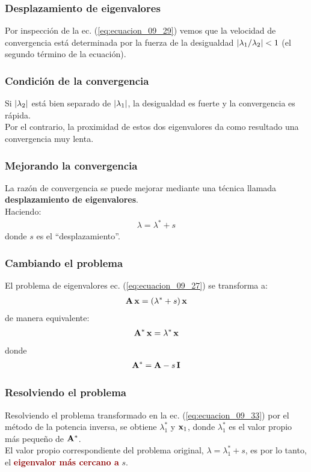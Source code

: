 \documentclass[12pt]{beamer}
\begin{document}
\begin{frame}
\frametitle{Desplazamiento de eigenvalores}
Por inspección de la ec. (\ref{eq:ecuacion_09_29}) vemos que la velocidad de convergencia está determinada por la fuerza de la desigualdad $\abs{\lambda_{1}/\lambda_{2}} < 1$ (el segundo término de la ecuación).
\end{frame}
\begin{frame}
\frametitle{Condición de la convergencia}
Si $\abs{\lambda_{2}}$ está bien separado de $\abs{\lambda_{1}}$, la desigualdad es fuerte y la convergencia es rápida.
\\
\bigskip
\pause
Por el contrario, la proximidad de estos dos eigenvalores da como resultado una convergencia muy lenta.
\end{frame}
\begin{frame}
\frametitle{Mejorando la convergencia}
La razón de convergencia se puede mejorar mediante una técnica llamada \textbf{\textcolor{cinnamon}{desplazamiento de eigenvalores}}.
\\
\bigskip
\pause
Haciendo:
\pause
\begin{align}
\lambda = \lambda^{*} + s
\label{eq:ecuacion_09_32}
\end{align}
donde $s$ es el \enquote{desplazamiento}.
\end{frame}
\begin{frame}
\frametitle{Cambiando el problema}
El problema de eigenvalores ec. (\ref{eq:ecuacion_09_27}) se transforma a:
\pause
\begin{align*}
\vb{ A \, x} = (\lambda^{*} + s) \, \vb{x}
\end{align*}
\pause
de manera equivalente:
\begin{align}
\vb{A^{*} \, x} = \lambda^{*} \, \vb{x}
\label{eq:ecuacion_09_33}
\end{align}
donde
\begin{align}
\vb{A}^{*} = \vb{A} - s \, \vb{I}
\label{eq:ecuacion_09_34}
\end{align}
\end{frame}
\begin{frame}
\frametitle{Resolviendo el problema}
Resolviendo el problema transformado en la ec. (\ref{eq:ecuacion_09_33}) por el método de la potencia inversa, se obtiene $\lambda^{*}_{1}$ y $\vb{x}_{1}$, \pause donde $\lambda^{*}_{1}$ es el valor propio más pequeño de $\vb{A}^{*}$.
\\
\bigskip
\pause
El valor propio correspondiente del problema original, $\lambda = \lambda_{1}^{*} + s$, es por lo tanto, el \textbf{\textcolor{darkred}{eigenvalor más cercano a}} $s$.
\end{frame}
\end{document}
